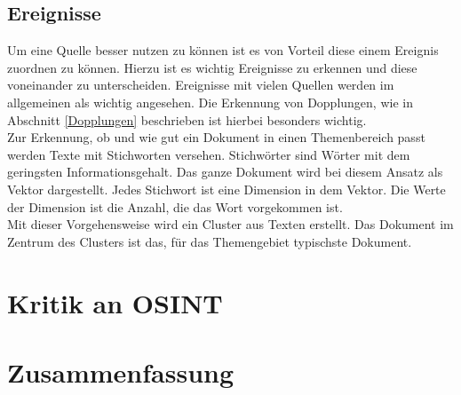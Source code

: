 \documentclass[twoside,a4paper]{article}
\begin{document}
\subsection{Ereignisse}
Um eine Quelle besser nutzen zu können ist es von Vorteil diese einem Ereignis zuordnen zu können. Hierzu ist es wichtig Ereignisse zu erkennen und diese voneinander zu unterscheiden. Ereignisse mit vielen Quellen werden im allgemeinen als wichtig angesehen. Die Erkennung von Dopplungen, wie in Abschnitt \ref{Dopplungen} beschrieben ist hierbei besonders wichtig.\\
Zur Erkennung, ob und wie gut ein Dokument in einen Themenbereich passt werden Texte mit Stichworten versehen. Stichwörter sind Wörter mit dem geringsten Informationsgehalt. Das ganze Dokument wird bei diesem Ansatz als Vektor dargestellt. Jedes Stichwort ist eine Dimension in dem Vektor. Die Werte der Dimension ist die Anzahl, die das Wort vorgekommen ist.\\
Mit dieser Vorgehensweise wird ein Cluster aus Texten erstellt. Das Dokument im Zentrum des Clusters ist das, für das Themengebiet typischste Dokument.


\section{Kritik an OSINT}



\section{Zusammenfassung}


\nocite{*}


\end{document}

